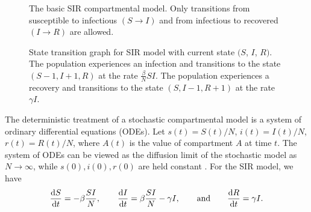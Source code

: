 \begin{figure}
    \centering
    \caption[The basic SIR compartmental model.]{The basic SIR compartmental model.
    Only transitions from susceptible to infectious \( (S \to I) \) and from infectious to recovered \( (I \to R) \) are allowed.}
    \label{ch_2:fig:SIR_diagram}
\end{figure}

\begin{figure}
    \centering
    \caption[State transition graph for SIR model.]{State transition graph for SIR model with current state \( (S \), \( I \),  \( R) \).
    The population experiences an infection and transitions to the state \( (S-1, I+1, R) \) at the rate \( \frac{\beta}{N}SI \).
    The population experiences a recovery and transitions to the state \( (S, I-1, R+1) \) at the rate \( \gamma I \).
    }
    \label{ch_2:fig:stocastic_SIR}
\end{figure}

The deterministic treatment of a stochastic compartmental model is a system of ordinary differential equations (ODEs).
Let \( s(t) = S(t) / N \), \( i(t) = I(t) / N \), \( r(t) = R(t) / N \), where \( A(t) \) is the value of compartment \( A \) at time \( t \).
The system of ODEs can be viewed as the diffusion limit of the stochastic model as \( N \to \infty \), while \( s(0), i(0), r(0) \) are held constant \citep{Greenwood2009, fuchs2013inference}.
For the SIR model, we have 
\begin{equation}
    \frac{\mathrm{d} S}{\mathrm{d} t} = -\beta \frac{SI}{N}, \qquad
    \frac{\mathrm{d} I}{\mathrm{d} t} = \beta \frac{SI}{N} - \gamma I, \qquad
    \text{and} \qquad
    \frac{\mathrm{d} R}{\mathrm{d} t} = \gamma I
    \text{.}
\label{ch_2:SIR_diff_eq}
\end{equation}


